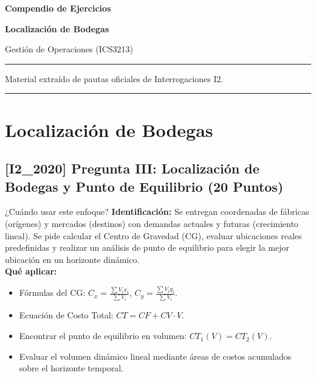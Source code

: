 \documentclass[11pt, a4paper]{article}
\begin{document}
\begin{titlepage}
  \centering
  \vspace*{2cm}
  {\Huge\bfseries\color{gopcyan} Compendio de Ejercicios\par}
  \vspace{0.4cm}
  {\LARGE\bfseries Localización de Bodegas\par}
  \vspace{0.3cm}
  {\large Gestión de Operaciones (ICS3213)\par}
  \vspace{1.2cm}
  \rule{\textwidth}{0.4pt}
  \vspace{0.4cm}
  {\small Material extraído de pautas oficiales de Interrogaciones I2.\par}
  \vspace{0.4cm}
  \rule{\textwidth}{0.4pt}
  \vfill
\end{titlepage}

\newpage
\section*{Localización de Bodegas}

\subsection*{[I2_2020] Pregunta III: Localización de Bodegas y Punto de Equilibrio (20 Puntos)}
\begin{tipprueba}{¿Cuándo usar este enfoque?}
    \textbf{Identificación:} Se entregan coordenadas de fábricas (orígenes) y mercados (destinos) con demandas actuales y futuras (crecimiento lineal). Se pide calcular el Centro de Gravedad (CG), evaluar ubicaciones reales predefinidas y realizar un análisis de punto de equilibrio para elegir la mejor ubicación en un horizonte dinámico.\\
    \textbf{Qué aplicar:}
    \begin{itemize}
      \item Fórmulas del CG: $C_x = \frac{\sum V_i x_i}{\sum V_i}$, $C_y = \frac{\sum V_i y_i}{\sum V_i}$.
      \item Ecuación de Costo Total: $CT = CF + CV \cdot V$.
      \item Encontrar el punto de equilibrio en volumen: $CT_1(V) = CT_2(V)$.
      \item Evaluar el volumen dinámico lineal mediante áreas de costos acumulados sobre el horizonte temporal.
    \end{itemize}
  \end{tipprueba}
\end{document}
